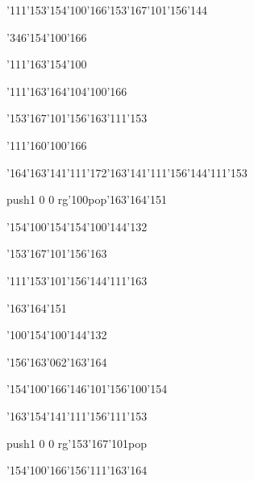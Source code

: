 \null\vfill\ipa\centerline{\enskip\char'111\char'153\enskip\char'154\char'100\char'166\enskip\char'153\char'167\char'101\char'156\char'144}\medskip\centerline{\enskip\char'346\enskip\char'154\char'100\char'166\enskip\enskip\enskip\enskip\enskip\enskip\enskip\enskip}\medskip\centerline{\enskip\char'111\enskip\char'163\char'154\char'100\enskip\enskip\enskip\enskip\enskip\enskip}\medskip\centerline{\enskip\enskip\enskip\enskip\char'111\char'163\char'164\enskip\enskip\enskip\enskip\char'104\char'100\char'166}\medskip\centerline{\enskip\enskip\enskip\enskip\enskip\char'153\char'167\char'101\char'156\char'163\enskip\enskip\enskip\enskip\enskip\enskip\enskip\char'111\char'153}\medskip\centerline{\enskip\char'111\enskip\char'160\char'100\char'166\enskip\enskip\enskip\enskip\enskip\enskip\enskip\enskip\enskip\enskip\enskip}\medskip\centerline{\enskip\char'164\char'163\char'141\char'111\char'172\enskip\enskip\enskip\enskip\char'163\char'141\char'111\char'156\char'144\enskip\char'111\char'153}\medskip\centerline{\enskip\pdfcolorstack\match push{1 0 0 rg}\char'100\pdfcolorstack\match pop{}\enskip\char'163\char'164\char'151\enskip\enskip\enskip\enskip\enskip\enskip}\medskip\centerline{\enskip\enskip\enskip\enskip\enskip\enskip\enskip\char'154\char'100\char'154\enskip\char'154\char'100\char'144\char'132}\medskip\vfill\footline{\hfil\tt\folio\hfil}\eject
\null\vfill\ipa\centerline{\enskip\enskip\enskip\enskip\enskip\enskip\enskip\enskip\char'153\char'167\char'101\char'156\char'163}\medskip\centerline{\enskip\char'111\enskip\enskip\enskip\enskip\enskip\char'153\char'101\char'156\char'144\enskip\char'111\char'163}\medskip\centerline{\enskip\enskip\enskip\char'163\char'164\char'151\enskip\enskip\enskip\enskip\enskip\enskip}\medskip\centerline{\enskip\char'100\char'154\enskip\char'100\char'144\char'132\enskip\enskip\enskip\enskip\enskip\enskip\enskip}\medskip\centerline{\enskip\enskip\enskip\enskip\enskip\enskip\enskip\enskip\enskip\enskip\enskip\char'156\char'163\char'062\char'163\char'164\enskip\enskip\enskip}\medskip\centerline{\enskip\enskip\enskip\char'154\char'100\char'166\enskip\char'146\char'101\char'156\enskip\enskip\enskip\enskip\enskip\char'100\char'154}\medskip\centerline{\enskip\char'163\char'154\char'141\char'111\char'156\enskip\enskip\enskip\enskip\enskip\enskip\enskip\enskip\enskip\enskip\char'111\char'153}\medskip\centerline{\enskip\enskip\enskip\pdfcolorstack\match push{1 0 0 rg}\char'153\char'167\char'101\pdfcolorstack\match pop{}\enskip\enskip\enskip\enskip\enskip\enskip}\medskip\centerline{\enskip\enskip\enskip\enskip\enskip\enskip\enskip\char'154\char'100\char'166\enskip\char'156\char'111\char'163\char'164}\medskip\vfill\footline{\hfil\tt\folio\hfil}\eject
